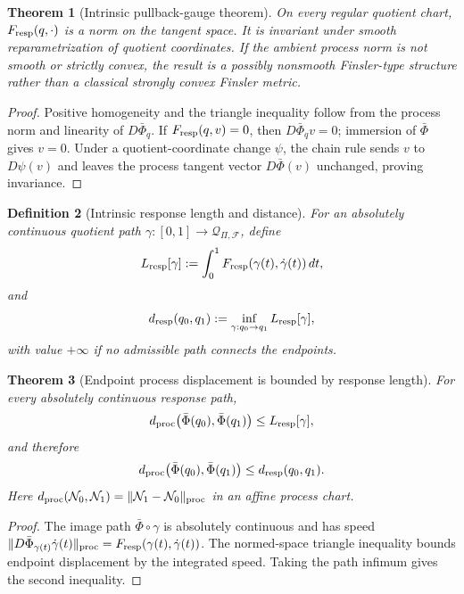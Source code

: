 \documentclass[11pt]{article}
\newtheorem{theorem}{Theorem}[section]
\newtheorem{definition}[theorem]{Definition}
\theoremstyle{remark}
\newcommand{\Qresp}{\mathcal Q}
\newcommand{\Fresp}{F_{\rm resp}}
\newcommand{\dresp}{d_{\rm resp}}
\newcommand{\dproc}{d_{\rm proc}}
\begin{document}
\begin{theorem}[Intrinsic pullback-gauge theorem]
\label{thm:pullback-gauge}
On every regular quotient chart, $\Fresp(q,\cdot)$ is a norm on the tangent space.  It is invariant under smooth reparametrization of quotient coordinates.  If the ambient process norm is not smooth or strictly convex, the result is a possibly nonsmooth Finsler-type structure rather than a classical strongly convex Finsler metric.
\end{theorem}

\begin{proof}
Positive homogeneity and the triangle inequality follow from the process norm and linearity of $D\bar\Phi_q$.  If $\Fresp(q,v)=0$, then $D\bar\Phi_qv=0$; immersion of $\bar\Phi$ gives $v=0$.  Under a quotient-coordinate change $\psi$, the chain rule sends $v$ to $D\psi(v)$ and leaves the process tangent vector $D\bar\Phi(v)$ unchanged, proving invariance.
\end{proof}

\begin{definition}[Intrinsic response length and distance]
For an absolutely continuous quotient path $\gamma:[0,1]\to\Qresp_{\Pi,\mathcal F}$, define
\[
        L_{\rm resp}[\gamma]
        :=\int_0^1\Fresp(\gamma(t),\dot\gamma(t))\,dt,
\]
and
\[
        \dresp(q_0,q_1)
        :=\inf_{\gamma:q_0\to q_1}L_{\rm resp}[\gamma],
\]
with value $+\infty$ if no admissible path connects the endpoints.
\end{definition}

\begin{theorem}[Endpoint process displacement is bounded by response length]
\label{thm:endpoint-process-bound}
For every absolutely continuous response path,
\[
        \dproc\!\left(\bar\Phi(q_0),\bar\Phi(q_1)\right)
        \le L_{\rm resp}[\gamma],
\]
and therefore
\[
        \dproc\!\left(\bar\Phi(q_0),\bar\Phi(q_1)\right)
        \le \dresp(q_0,q_1).
\]
Here $\dproc(\mathcal N_0,\mathcal N_1)=\|\mathcal N_1-\mathcal N_0\|_{\rm proc}$ in an affine process chart.
\end{theorem}

\begin{proof}
The image path $\bar\Phi\circ\gamma$ is absolutely continuous and has speed $\|D\bar\Phi_{\gamma(t)}\dot\gamma(t)\|_{\rm proc}=\Fresp(\gamma(t),\dot\gamma(t))$.  The normed-space triangle inequality bounds endpoint displacement by the integrated speed.  Taking the path infimum gives the second inequality.
\end{proof}
\end{document}
